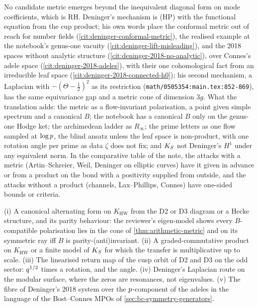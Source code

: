 \begin{observation}
\label{obs:deninger-same-gap}
No candidate metric emerges beyond the inequivalent diagonal form on mode coefficients, which is RH. Deninger's
mechanism is (HP) with the functional equation from the cup product; his own words place the conformal metric out
of reach for number fields (\cref{cit:deninger-conformal-metric}), the realised example at the notebook's
genus-one vacuity (\cref{cit:deninger-lift-misleading}), and the 2018 spaces without analytic structure
(\cref{cit:deninger-2018-no-analytic}), over Connes's adele space (\cref{cit:deninger-2018-adeles}), with their one
cohomological fact from an irreducible leaf space (\cref{cit:deninger-2018-connected-h0}); his second mechanism,
a Laplacian with $-(\Theta-\tfrac12)^2$ as its restriction (\texttt{math/0505354:main.tex:852-869}), has the same
equivariance gap and a metric cone of dimension $3g$. What the translation adds: the metric as a flow-invariant
polarisation, a point given simple spectrum and a canonical $B$; the notebook has a canonical $B$ only on the
genus-one Hodge ket; the archimedean ladder as $R_\infty$; the prime letters as one flow sampled at $\log p$, the
blind ansatz unless the leaf space is non-product, with one rotation angle per prime as data $\zeta$ does not fix;
and $K_S$ not Deninger's $H^1$ under any equivalent norm. In the comparative table of the note, the attacks with a
metric (Artin--Schreier, Weil, Deninger on elliptic curves) have it given in advance or from a product on the bond
with a positivity supplied from outside, and the attacks without a product (channels, Lax--Phillips, Connes) have
one-sided bounds or criteria.
\end{observation}

\begin{observation}
\label{obs:deninger-next}
(i) A canonical alternating form on $K_{\mathrm{HW}}$ from the D2 or D3 diagram or a Hecke structure, and its parity
behaviour: the reviewer's eigen-model shows every $B$-compatible polarisation lies in the cone of
\cref{thm:arithmetic-metric} and on its symmetric ray iff $B$ is parity-(anti)invariant. (ii) A graded-commutative
product on $K_{\mathrm{HW}}$ or a finite model of $K_S$ for which the transfer is multiplicative up to scale. (iii) The
linearised return map of the cusp orbit of D2 and D3 on the odd sector: $q^{1/2}$ times a rotation, and the
angle. (iv) Deninger's Laplacian route on the modular surface, where the zeros are resonances, not eigenvalues.
(v) The fibre of Deninger's 2018 system over the $p$-component of the adeles in the language of the Bost--Connes
MPOs of \cref{sec:bc-symmetry-generators}.
\end{observation}
